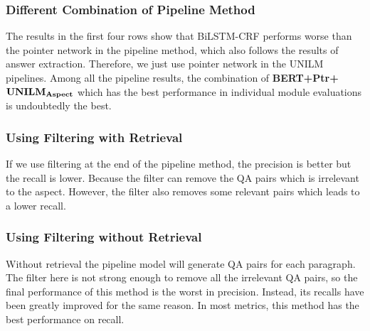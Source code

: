 \subsubsection{Different Combination of Pipeline Method}
The results in the first four rows show that BiLSTM-CRF performs worse than the pointer network in the pipeline method, which also follows the results of answer extraction. 
Therefore, we just use pointer network in the UNILM pipelines.
Among all the pipeline results, the combination of \textbf{BERT+Ptr+}$\text{\textbf{UNILM}}_{\text{\textbf{Aspect}}}$ which has the best performance in individual module evaluations is undoubtedly the best.

\subsubsection{Using Filtering with Retrieval}
If we use filtering at the end of the pipeline method, the precision is better but the recall is lower. 
Because the filter can remove the QA pairs which is irrelevant to the aspect. 
However, the filter also removes some relevant pairs which leads to a lower recall.

\subsubsection{Using Filtering without Retrieval}
Without retrieval the pipeline model will generate QA pairs for each paragraph.
The filter here is not strong enough to remove all the irrelevant QA pairs, so the final performance of this method is the worst in precision.
Instead, its recalls have been greatly improved for the same reason.
In most metrics, this method has the best performance on recall.

